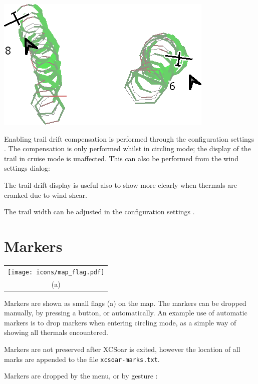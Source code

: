 \begin{center}
\includegraphics[angle=0,width=0.8\linewidth,keepaspectratio='true']{figures/traildrift.png}
\end{center}

Enabling trail drift compensation is performed through the
configuration settings .  The compensation is only performed
whilst in circling mode; the display of the trail in cruise mode is unaffected.
This can also be performed from the wind settings dialog:
\begin{quote}
\blink{}
\end{quote}

The trail drift display is useful also to show more clearly when thermals
are cranked due to wind shear.

The trail width can be adjusted in the configuration settings .

\section{Markers}

\begin{tabular}{c}%
\texttt{[image: icons/map\_flag.pdf]}\\
(a)
\end{tabular}


Markers are shown as small flags (a) on the map.  The markers can be dropped
manually, by pressing a button, or automatically.  An example use of
automatic markers is to drop markers when entering circling mode, as a
simple way of showing all thermals encountered.

Markers are not preserved after XCSoar is exited, however the location
of all marks are appended to the file \verb|xcsoar-marks.txt|.

Markers are dropped by the menu, or by gesture : 
\begin{quote}
\blink{}
\end{quote}

